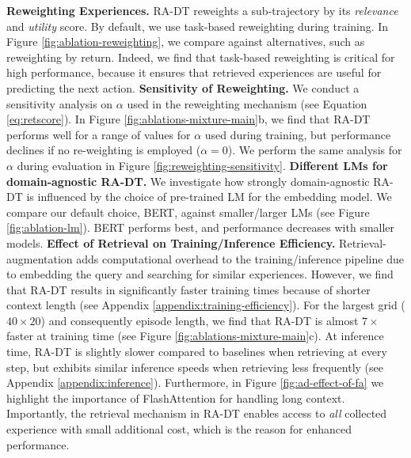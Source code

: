 \documentclass{article}
\begin{document}
\textbf{Reweighting Experiences.}
RA-DT reweights a sub-trajectory by its \textit{relevance} and \textit{utility} score.
By default, we use task-based reweighting during training.
In Figure \ref{fig:ablation-reweighting}, we compare against alternatives, such as reweighting by return.
Indeed, we find that task-based reweighting is critical for high performance, because it ensures that retrieved experiences are useful for predicting the next action.
\textbf{Sensitivity of Reweighting.} We conduct a sensitivity analysis on $\alpha$ used in the reweighting mechanism (see Equation \ref{eq:retscore}).
In Figure \ref{fig:ablations-mixture-main}b, we find that RA-DT performs well for a range of values for $\alpha$ used during training, but performance declines if no re-weighting is employed ($\alpha=0$).
We perform the same analysis for $\alpha$ during evaluation in Figure \ref{fig:reweighting-sensitivity}.
\textbf{Different LMs for domain-agnostic RA-DT.}
We investigate how strongly domain-agnostic RA-DT is influenced by the choice of pre-trained LM for the embedding model.
We compare our default choice, BERT, against smaller/larger LMs (see Figure \ref{fig:ablation-lm}).
BERT performs best, and performance decreases with smaller models.
\textbf{Effect of Retrieval on Training/Inference Efficiency.}
Retrieval-augmentation adds computational overhead to the training/inference pipeline due to embedding the query and searching for similar experiences.
However, we find that RA-DT results in significantly faster training times because of shorter context length (see Appendix \ref{appendix:training-efficiency}).
For the largest grid ($40\times20$) and consequently episode length, we find that RA-DT is almost $7\times$ faster at training time (see Figure \ref{fig:ablations-mixture-main}c).
At inference time, RA-DT is slightly slower compared to baselines when retrieving at every step, but exhibits similar inference speeds when retrieving less frequently (see Appendix \ref{appendix:inference}).
Furthermore, in Figure \ref{fig:ad-effect-of-fa} we highlight the importance of FlashAttention \citep{Dao:23} for handling long context.
Importantly, the retrieval mechanism in RA-DT enables access to \emph{all} collected experience with small additional cost, which is the reason for enhanced performance.
\end{document}
